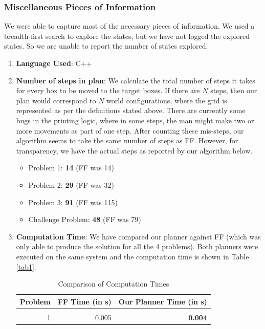 \documentclass[10pt, letter]{article}
\begin{document}
\subsubsection*{Miscellaneous Pieces of Information}
We were able to capture most of the necessary pieces of information. We used a breadth-first search to explore the states, but we have not logged the explored states. So we are unable to report the number of states explored.
\begin{enumerate}
\item \textbf{Language Used}: C++
\item \textbf{Number of steps in plan}: We calculate the total number of steps it takes for every box to be moved to the target boxes. If there are $N$ steps, then our plan would correspond to $N$ world configurations, where the grid is represented as per the definitions stated above. There are currently some bugs in the printing logic, where in some steps, the man might make two or more movements as part of one step. After counting these mis-steps, our algorithm seems to take the same number of steps as FF. However, for transparency, we have the actual steps as reported by our algorithm below.
\begin{itemize}
\item Problem 1: \textbf{14} (FF was 14)
\item Problem 2: \textbf{29} (FF was 32)
\item Problem 3: \textbf{91} (FF was 115)
\item Challenge Problem: \textbf{48} (FF was 79)
\end{itemize}
\item \textbf{Computation Time}: We have compared our planner against FF (which was only able to produce the solution for all the 4 problems). Both planners were executed on the same system and the computation time is shown in Table \ref{tab1}.

\begin{table}[htbp]
\caption{Comparison of Computation Times}
\centering
\begin{tabular}{|r|r|r|}
\hline
\multicolumn{1}{|l|}{Problem} & \multicolumn{1}{l|}{FF Time (in s)} & \multicolumn{1}{l|}{Our Planner Time (in s)} \\ \hline
\multicolumn{1}{|l|}{} & \multicolumn{1}{l|}{} & \multicolumn{1}{l|}{} \\ \hline
1 & 0.005 & \textbf{0.004} \\ \hline


\end{tabular}
\end{table}
\end{enumerate}
\end{document}
